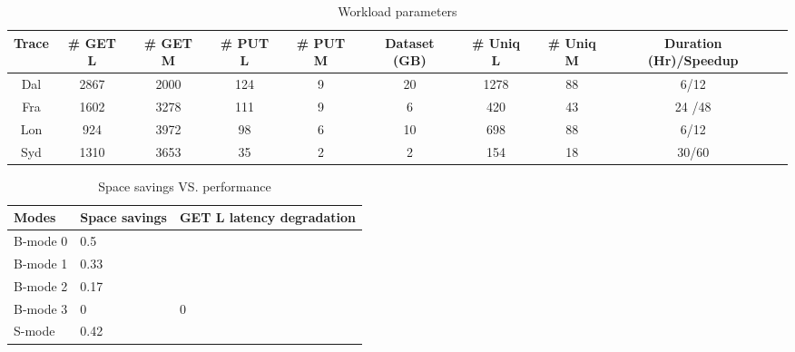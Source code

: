 
\begin{table*}[h!]
	\centering
	{\tiny }
	\caption{Workload parameters}
	\begin{tabular}{| c | c | c | c | c | c | c | c | c |c |} 
		\hline
	Trace    &   \# GET L & \# GET M & \# PUT L & \# PUT M & Dataset (GB) & \# Uniq L & \# Uniq M & Duration (Hr)/Speedup  \\ 
		\hline\hline
		Dal    &  2867  & 2000   & 124  & 9    & 20    & 1278 & 88  & 6/12    \\ 
		\hline
		Fra     &  1602  & 3278   & 111  & 9     & 6   & 420 & 43  & 24 /48   \\
		\hline
		Lon    &  924    & 3972   & 98  & 6     & 10      & 698 & 88  & 6/12    \\
		\hline 
		Syd      &  1310   & 3653   & 35 & 2    & 2    & 154 & 18  & 30/60    \\  
		\hline
	\end{tabular}

\label{tab:eval-overall}
\end{table*}

\begin{table}[h!]
	{\tiny }
	\caption{Space savings VS. performance}
	\begin{tabular}{| l | l | p{3cm}| } %
		\hline
		Modes    & Space savings & GET L latency degradation  \\ 
		\hline\hline
		B-mode 0    &   0.5   &     \\ 
		\hline
		B-mode 1    &   0.33   &     \\ 
		\hline
		B-mode 2    &   0.17   &     \\
		\hline
		B-mode 3     &   0   &    0\\
		\hline
		S-mode    &  0.42    &     \\
		\hline
	\end{tabular}
	
	\label{tab:eval-schemes}
\end{table}